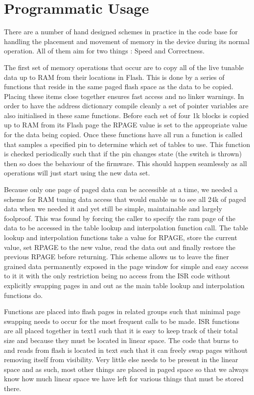 \documentclass[12pt,a4paper,titlepage]{article}
\begin{document}
\section{Programmatic Usage}

There are a number of hand designed schemes in practice in the code base for handling the placement and movement of memory in the device during its normal operation. All of them aim for two things : Speed and Correctness.

The first set of memory operations that occur are to copy all of the live tunable data up to RAM from their locations in Flash. This is done by a series of functions that reside in the same paged flash space as the data to be copied. Placing these items close together ensures fast access and no linker warnings. In order to have the address dictionary compile cleanly a set of pointer variables are also initialised in these same functions. Before each set of four 1k blocks is copied up to RAM from its Flash page the RPAGE value is set to the appropriate value for the data being copied. Once these functions have all run a function is called that samples a specified pin to determine which set of tables to use. This function is checked periodically such that if the pin changes state (the switch is thrown) then so does the behaviour of the firmware. This should happen seamlessly as all operations will just start using the new data set.

Because only one page of paged data can be accessible at a time, we needed a scheme for RAM tuning data access that would enable us to see all 24k of paged data when we needed it and yet still be simple, maintainable and largely foolproof. This was found by forcing the caller to specify the ram page of the data to be accessed in the table lookup and interpolation function call. The table lookup and interpolation functions take a value for RPAGE, store the current value, set RPAGE to the new value, read the data out and finally restore the previous RPAGE before returning. This scheme allows us to leave the finer grained data permanently exposed in the page window for simple and easy access to it it with the only restriction being no access from the ISR code without explicitly swapping pages in and out as the main table lookup and interpolation functions do.

Functions are placed into flash pages in related groups such that minimal page swapping needs to occur for the most frequent calls to be made. ISR functions are all placed together in text1 such that it is easy to keep track of their total size and because they must be located in linear space. The code that burns to and reads from flash is located in text such that it can freely swap pages without removing itself from visibility. Very little else needs to be present in the linear space and as such, most other things are placed in paged space so that we always know how much linear space we have left for various things that must be stored there.
\end{document}

